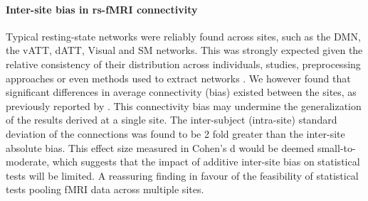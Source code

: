 \documentclass[authoryear]{elsarticle}
\begin{document}
\paragraph{Inter-site bias in rs-fMRI connectivity} Typical resting-state networks were reliably found across sites, such as the DMN, the vATT, dATT, Visual and SM networks. This was strongly expected given the relative consistency of their distribution across individuals, studies, preprocessing approaches or even methods used to extract networks \citep{Damoiseaux2006,vandeheuvel2008,Bellec2010c,Yeo2011,Power2011}. We however found that significant differences in average connectivity (bias) existed between the sites, as previously reported by \citep{Yan2013a}. This connectivity bias may undermine the generalization of the results derived at a single site. The inter-subject (intra-site) standard deviation of the connections was found to be 2 fold greater than the inter-site absolute bias. This effect size measured in Cohen's d would be deemed small-to-moderate, which suggests that the impact of additive inter-site bias on statistical tests will be limited. A reassuring finding in favour of the feasibility of statistical tests pooling fMRI data across multiple sites.\\

\end{document}
